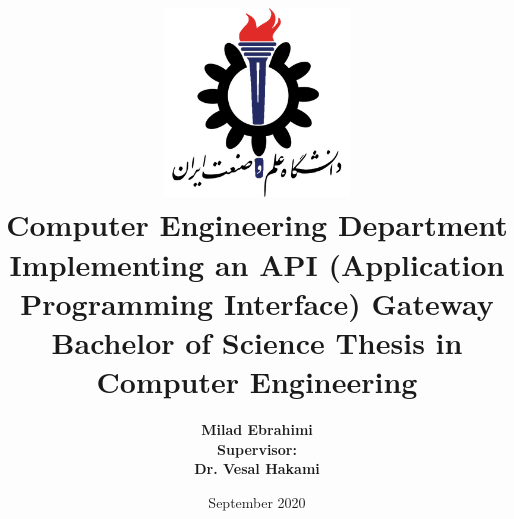 \newpage
\thispagestyle{empty}
\begin{latin}
    \title{
        \center
        \includegraphics[width=5cm, height=5cm]{images/IUST_logo_color.png} \\ [10pt]
        Computer Engineering Department \\ [40pt]

        \textbf{ Implementing an API (Application Programming Interface) Gateway} \\ [20pt]

        \textbf{ Bachelor of Science Thesis in Computer Engineering} \\ [60pt]

    }

    \author{
        \center
        \textbf{Milad Ebrahimi} \\ [30pt]


        \textbf{Supervisor:} \\ [10pt]
        \textbf{Dr. Vesal Hakami} \\ [40pt]
    }
    \center
    \date{
        \center
        September 2020
    }

\end{latin}
